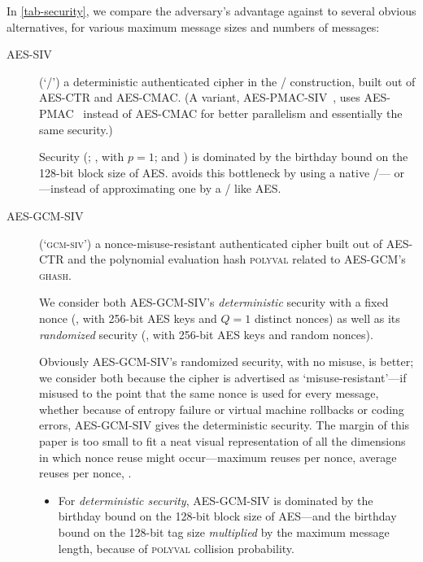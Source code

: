 \documentclass[draft]{article}
\DeclareRobustCommand{\operatorsc}[1]{{%
  \ifmmode\let\next=\operatorname\else\let\next=\relax\fi\next{\textsc{#1}}}}
\def\Salsa#1/{\operatorsc{Salsa#1}}
\def\ChaCha#1/{\operatorsc{ChaCha#1}}
\def\Daence/{\operatorsc{Daence}}
\def\GHASH/{\textsc{ghash}}
\def\POLYVAL/{\textsc{polyval}}
\def\GCMSIV/{\textsc{gcm\nobreakdash-siv}}
\def\AES/{AES}
\def\AESCTR/{AES\nobreakdash-CTR}
\def\AESSIV/{AES\nobreakdash-CTR}
\def\AESCMAC/{AES\nobreakdash-CMAC}
\def\AESPMAC/{AES\nobreakdash-PMAC}
\def\AESSIV/{AES\nobreakdash-SIV}
\def\AESGCM/{AES\nobreakdash-GCM}
\def\AESGCMSIV/{AES\nobreakdash-GCM\nobreakdash-SIV}
\def\AESPMACSIV/{AES\nobreakdash-PMAC\nobreakdash-SIV}
\begin{document}
In \autoref{tab-security}, we compare the adversary's advantage against
 \Daence/ to several obvious alternatives, for various maximum message
 sizes and numbers of messages:

\begin{description}
  \item[\AESSIV/] (`\SIV/')
     a deterministic authenticated cipher in the \SIV/ construction,
     built out of \AESCTR/ and \AESCMAC/.
    (A variant, \AESPMACSIV/~\cite{arcieri2018aespmacsiv}, uses
     \AESPMAC/~\cite{black-rogaway2002pmac-eurocrypt} instead of
     \AESCMAC/ for better parallelism and essentially the same
     security.)

    Security
     (\cite[\S4, Theorem~2]{rogaway-shrimpton2006keywrap};
      \cite[\S5, Theorem~3]{rogaway-shrimpton2006keywrap},
       with $p=1$; and
      \cite[\S2, Theorem~2.2]{bernstein2005permutations})
     is dominated by the birthday bound on the 128-bit block size of
     \AES/.
    \Daence/ avoids this bottleneck by using a native \PRF/---\Salsa20/
     or \ChaCha/---instead of approximating one by a \PRP/ like \AES/.

  \item[\AESGCMSIV/] (`\GCMSIV/')
     a nonce-misuse-resistant authenticated cipher built out of
     \AESCTR/ and the polynomial evaluation hash \POLYVAL/ related to
     \AESGCM/'s \GHASH/.

    We consider both \AESGCMSIV/'s \emph{deterministic} security with a
     fixed nonce
     (\cite[\S4, Theorem~3]{iwata-seurin2017gcmsivsecurity}, with
      256-bit \AES/ keys and $Q = 1$ distinct nonces)
     as well as its \emph{randomized} security
     (\cite[\S3.3, Corollary~1]{iwata-seurin2017gcmsivsecurity},
      with 256-bit \AES/ keys and random nonces).

    Obviously \AESGCMSIV/'s randomized security, with no misuse, is
     better; we consider both because the cipher is advertised as
     `misuse-resistant'---if misused to the point that the same nonce
     is used for every message, whether because of entropy failure or
     virtual machine rollbacks or coding errors, \AESGCMSIV/ gives the
     deterministic security.
    The margin of this paper is too small to fit a neat visual
     representation of all the dimensions in which nonce reuse might
     occur---maximum reuses per nonce, average reuses per nonce, \etc.
    \begin{itemize}
      \item For \emph{deterministic security}, \AESGCMSIV/ is dominated
         by the birthday bound on the 128-bit block size of \AES/---and
         the birthday bound on the 128-bit tag size \emph{multiplied}
         by the maximum message length, because of \POLYVAL/ collision
         probability.


\end{itemize}
\end{description}
\end{document}
